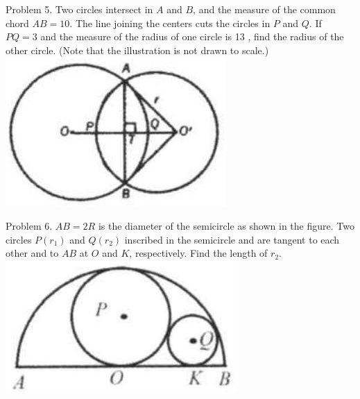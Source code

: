 \documentclass[10pt]{article}
\begin{document}
Problem 5. Two circles intersect in \(A\) and \(B\), and the measure of the common chord \(A B=10\). The line joining the centers cuts the circles in \(P\) and \(Q\). If \(P Q=3\) and the measure of the radius of one circle is 13 , find the radius of the other circle. (Note that the illustration is not drawn to scale.)\\
\includegraphics[max width=\textwidth, center]{2025_04_17_97bc1f7e44d93c271a88g-185}

Problem 6. \(A B=2 R\) is the diameter of the semicircle as shown in the figure. Two circles \(P\left(r_{1}\right)\) and \(Q\left(r_{2}\right)\) inscribed in the semicircle and are tangent to each other and to \(A B\) at \(O\) and \(K\), respectively. Find the length of \(r_{2}\).\\
\includegraphics[max width=\textwidth, center]{2025_04_17_97bc1f7e44d93c271a88g-185(2)}
\end{document}
